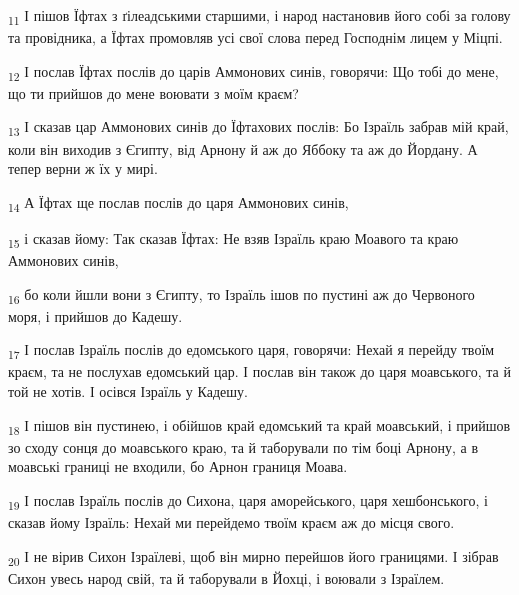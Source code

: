 \begin{tcolorbox}
\textsubscript{11} І пішов Їфтах з ґілеадськими старшими, і народ настановив його собі за голову та провідника, а Їфтах промовляв усі свої слова перед Господнім лицем у Міцпі.
\end{tcolorbox}
\begin{tcolorbox}
\textsubscript{12} І послав Їфтах послів до царів Аммонових синів, говорячи: Що тобі до мене, що ти прийшов до мене воювати з моїм краєм?
\end{tcolorbox}
\begin{tcolorbox}
\textsubscript{13} І сказав цар Аммонових синів до Їфтахових послів: Бо Ізраїль забрав мій край, коли він виходив з Єгипту, від Арнону й аж до Яббоку та аж до Йордану. А тепер верни ж їх у мирі.
\end{tcolorbox}
\begin{tcolorbox}
\textsubscript{14} А Їфтах ще послав послів до царя Аммонових синів,
\end{tcolorbox}
\begin{tcolorbox}
\textsubscript{15} і сказав йому: Так сказав Їфтах: Не взяв Ізраїль краю Моавого та краю Аммонових синів,
\end{tcolorbox}
\begin{tcolorbox}
\textsubscript{16} бо коли йшли вони з Єгипту, то Ізраїль ішов по пустині аж до Червоного моря, і прийшов до Кадешу.
\end{tcolorbox}
\begin{tcolorbox}
\textsubscript{17} І послав Ізраїль послів до едомського царя, говорячи: Нехай я перейду твоїм краєм, та не послухав едомський цар. І послав він також до царя моавського, та й той не хотів. І осівся Ізраїль у Кадешу.
\end{tcolorbox}
\begin{tcolorbox}
\textsubscript{18} І пішов він пустинею, і обійшов край едомський та край моавський, і прийшов зо сходу сонця до моавського краю, та й таборували по тім боці Арнону, а в моавські границі не входили, бо Арнон границя Моава.
\end{tcolorbox}
\begin{tcolorbox}
\textsubscript{19} І послав Ізраїль послів до Сихона, царя аморейського, царя хешбонського, і сказав йому Ізраїль: Нехай ми перейдемо твоїм краєм аж до місця свого.
\end{tcolorbox}
\begin{tcolorbox}
\textsubscript{20} І не вірив Сихон Ізраїлеві, щоб він мирно перейшов його границями. І зібрав Сихон увесь народ свій, та й таборували в Йохці, і воювали з Ізраїлем.
\end{tcolorbox}
